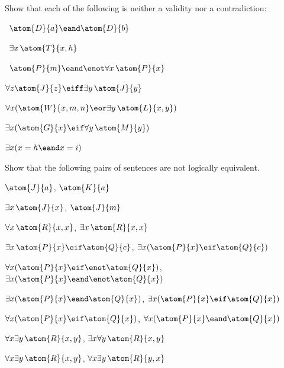 \solutions
\problempart
\label{pr.Contingent}
Show that each of the following is neither a validity nor a contradiction:
\begin{compactlist}
\item \leftsolutions\ $\atom{D}{a}  \eand \atom{D}{b}$
\item \leftsolutions\ $\exists x\, \atom{T}{x,h}$
\item \leftsolutions\ $\atom{P}{m}  \eand \enot\forall x\, \atom{P}{x}$
\item $\forall z \atom{J}{z} \eiff \exists y\, \atom{J}{y}$
\item $\forall x (\atom{W}{x,m,n} \eor \exists y\,\atom{L}{x,y})$
\item $\exists x (\atom{G}{x} \eif \forall y\, \atom{M}{y})$
\item $\exists x (x = h \eand x = i)$
\end{compactlist}

\solutions
\problempart
\label{pr.NotEquiv}
Show that the following pairs of sentences are not logically equivalent.
\begin{compactlist}
\item $\atom{J}{a} $,  $\atom{K}{a}$
\item $\exists x\, \atom{J}{x}$,  $\atom{J}{m}$
\item $\forall x\, \atom{R}{x,x}$, $\exists x\, \atom{R}{x,x}$
\item $\exists x\, \atom{P}{x} \eif \atom{Q}{c}$, $\exists x (\atom{P}{x} \eif \atom{Q}{c})$
\item $\forall x(\atom{P}{x} \eif \enot \atom{Q}{x})$, $\exists x(\atom{P}{x} \eand \enot \atom{Q}{x})$
\item $\exists x(\atom{P}{x} \eand \atom{Q}{x})$, $\exists x(\atom{P}{x} \eif \atom{Q}{x})$
\item $\forall x(\atom{P}{x}\eif \atom{Q}{x})$, $\forall x(\atom{P}{x} \eand \atom{Q}{x})$
\item $\forall x\exists y\, \atom{R}{x,y}$, $\exists x\forall y\, \atom{R}{x,y}$
\item $\forall x\exists y\, \atom{R}{x,y}$, $\forall x\exists y\, \atom{R}{y,x}$
\end{compactlist}



